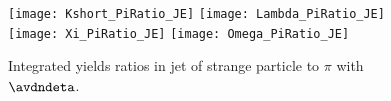 \begin{figure}[ht]
	\begin{center}
		\texttt{[image: Kshort\_PiRatio\_JE]}
		\texttt{[image: Lambda\_PiRatio\_JE]}
		\texttt{[image: Xi\_PiRatio\_JE]}
		\texttt{[image: Omega\_PiRatio\_JE]}
	\end{center}
	\caption{Integrated yields ratios in jet of strange particle to $\pi$ with $\avdndeta$.}
	\label{fig:JEIntePartoPiRatio}
\end{figure}
%
%
%

